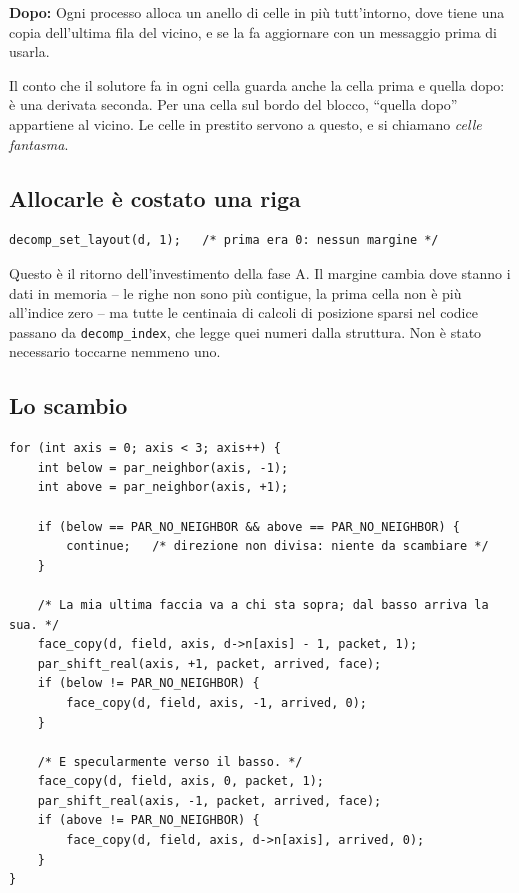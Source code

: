 \documentclass[11pt,a4paper]{article}
\newcommand{\dopo}[1]{\par\smallskip\noindent\textbf{\color{scuro}Dopo:} #1\par\smallskip}
\newcommand{\cd}[1]{\texttt{\small #1}}
\begin{document}
\dopo{Ogni processo alloca un anello di celle in più tutt'intorno, dove tiene
una copia dell'ultima fila del vicino, e se la fa aggiornare con un messaggio
prima di usarla.}

Il conto che il solutore fa in ogni cella guarda anche la cella prima e quella
dopo: è una derivata seconda. Per una cella sul bordo del blocco, ``quella
dopo'' appartiene al vicino. Le celle in prestito servono a questo, e si
chiamano \emph{celle fantasma}.

\subsection*{Allocarle è costato una riga}

\begin{lstlisting}
decomp_set_layout(d, 1);   /* prima era 0: nessun margine */
\end{lstlisting}

Questo è il ritorno dell'investimento della fase A. Il margine cambia dove
stanno i dati in memoria -- le righe non sono più contigue, la prima cella non
è più all'indice zero -- ma tutte le centinaia di calcoli di posizione sparsi
nel codice passano da \cd{decomp\_index}, che legge quei numeri dalla
struttura. Non è stato necessario toccarne nemmeno uno.

\subsection*{Lo scambio}

\begin{lstlisting}
for (int axis = 0; axis < 3; axis++) {
    int below = par_neighbor(axis, -1);
    int above = par_neighbor(axis, +1);

    if (below == PAR_NO_NEIGHBOR && above == PAR_NO_NEIGHBOR) {
        continue;   /* direzione non divisa: niente da scambiare */
    }

    /* La mia ultima faccia va a chi sta sopra; dal basso arriva la sua. */
    face_copy(d, field, axis, d->n[axis] - 1, packet, 1);
    par_shift_real(axis, +1, packet, arrived, face);
    if (below != PAR_NO_NEIGHBOR) {
        face_copy(d, field, axis, -1, arrived, 0);
    }

    /* E specularmente verso il basso. */
    face_copy(d, field, axis, 0, packet, 1);
    par_shift_real(axis, -1, packet, arrived, face);
    if (above != PAR_NO_NEIGHBOR) {
        face_copy(d, field, axis, d->n[axis], arrived, 0);
    }
}
\end{lstlisting}
\end{document}
